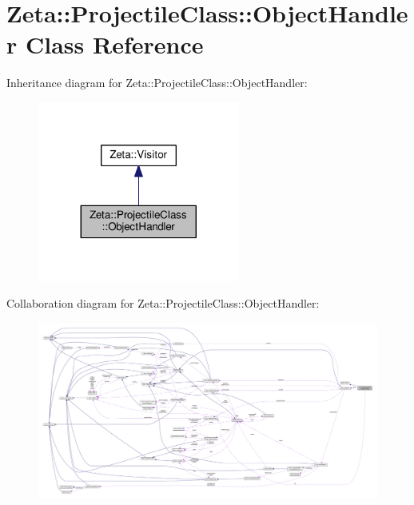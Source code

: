 \hypertarget{classZeta_1_1ProjectileClass_1_1ObjectHandler}{\section{Zeta\+:\+:Projectile\+Class\+:\+:Object\+Handler Class Reference}
\label{classZeta_1_1ProjectileClass_1_1ObjectHandler}
}


Inheritance diagram for Zeta\+:\+:Projectile\+Class\+:\+:Object\+Handler\+:\nopagebreak
\begin{figure}[H]
\begin{center}
\leavevmode
\includegraphics[width=188pt]{classZeta_1_1ProjectileClass_1_1ObjectHandler__inherit__graph}
\end{center}
\end{figure}


Collaboration diagram for Zeta\+:\+:Projectile\+Class\+:\+:Object\+Handler\+:
\nopagebreak
\begin{figure}[H]
\begin{center}
\leavevmode
\includegraphics[width=350pt]{classZeta_1_1ProjectileClass_1_1ObjectHandler__coll__graph}
\end{center}
\end{figure}
